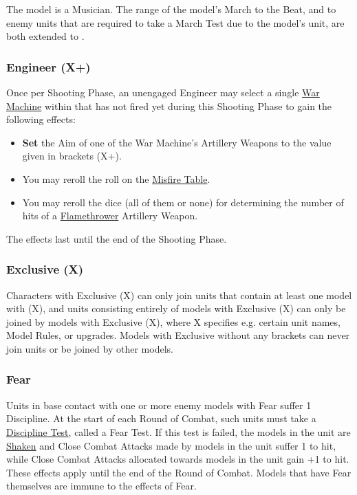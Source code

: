 The model is a Musician. The range of the model’s March to the Beat, and to enemy units that are required to take a March Test due to the model's unit, are both extended to .

\subsubsection{Engineer (X+)}
\idx[main=y]{\engineer{}}\label{engineer}

Once per Shooting Phase, an unengaged Engineer may select a single \hyperref[war_machine]{War Machine} within  that has not fired yet during this Shooting Phase to gain the following effects:

\begin{itemize}
	\item \textbf{Set} the Aim of one of the War Machine's Artillery Weapons to the value given in brackets (X+).
	\item You may reroll the roll on the \hyperref[the_misfire_table]{Misfire Table}.
	\item You may reroll the dice (all of them or none) for determining the number of hits of a \hyperref[flamethrower]{Fla\-me\-thrower} Artillery Weapon.
\end{itemize}

The effects last until the end of the Shooting Phase.

\subsubsection{Exclusive (X)}
\idx[main=y]{\exclusive{}}\label{exclusive}

Characters with Exclusive (X) can only join units that contain at least one model with (X), and units consisting entirely of models with Exclusive (X) can only be joined by models with Exclusive (X), where X specifies e.g. certain unit names, Model Rules, or upgrades. Models with Exclusive without any brackets can never join units or be joined by other models.

\subsubsection{Fear}
\idx[main=y]{\fear}\label{fear}

Units in base contact with one or more enemy models with Fear suffer \minuss{}1 Discipline. At the start of each Round of Combat, such units must take a \hyperref[discipline_tests]{Discipline Test}, called a Fear Test. If this test is failed, the models in the unit are \hyperref[shaken]{Shaken} and Close Combat Attacks made by models in the unit suffer \minuss{}1 to hit, while Close Combat Attacks allocated towards models in the unit gain +1 to hit. These effects apply until the end of the Round of Combat. Models that have Fear themselves are immune to the effects of Fear.

